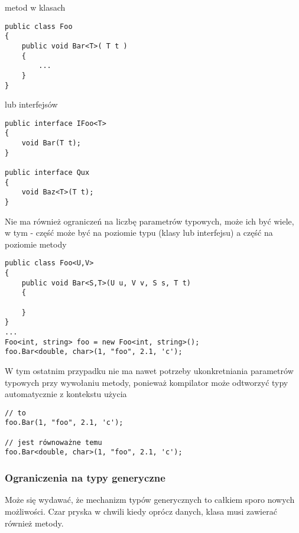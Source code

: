 metod w klasach 

\begin{scriptsize}
\begin{verbatim}
public class Foo
{
    public void Bar<T>( T t )
    {
        ...
    }
}
\end{verbatim}
\end{scriptsize}

lub interfejsów

\begin{scriptsize}
\begin{verbatim}
public interface IFoo<T>
{
    void Bar(T t);
}

public interface Qux
{
    void Baz<T>(T t);
}
\end{verbatim}
\end{scriptsize}

Nie ma również ograniczeń na liczbę parametrów typowych, może ich być wiele, w tym - część może być na poziomie typu
(klasy lub interfejsu) a część na poziomie metody

\begin{scriptsize}
\begin{verbatim}
public class Foo<U,V>
{
    public void Bar<S,T>(U u, V v, S s, T t)
    {

    }
}
...
Foo<int, string> foo = new Foo<int, string>();
foo.Bar<double, char>(1, "foo", 2.1, 'c');
\end{verbatim}
\end{scriptsize}

W tym ostatnim przypadku nie ma nawet potrzeby ukonkretniania parametrów typowych przy wywołaniu metody,
ponieważ kompilator może odtworzyć typy automatycznie z kontekstu użycia

\begin{scriptsize}
\begin{verbatim}
// to
foo.Bar(1, "foo", 2.1, 'c');

// jest równoważne temu
foo.Bar<double, char>(1, "foo", 2.1, 'c');
\end{verbatim}
\end{scriptsize}

\subsubsection{Ograniczenia na typy generyczne}

Może się wydawać, że mechanizm typów generycznych to całkiem sporo nowych możliwości. Czar pryska w chwili
kiedy oprócz danych, klasa musi zawierać również metody.

